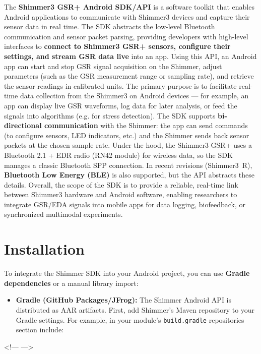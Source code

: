The \textbf{Shimmer3 GSR+ Android SDK/API} is a software toolkit that enables
Android applications to communicate with Shimmer3 devices and capture
their sensor data in real time. The SDK abstracts the low-level
Bluetooth communication and sensor packet parsing, providing developers
with high-level interfaces to \textbf{connect to Shimmer3 GSR+ sensors,
configure their settings, and stream GSR data live} into an
app\cite{GSRFacialThermal2021}.
Using this API, an Android app can start and stop GSR signal acquisition
on the Shimmer, adjust parameters (such as the GSR measurement range or
sampling rate), and retrieve the sensor readings in calibrated units.
The primary purpose is to facilitate real-time data collection from the
Shimmer3 on Android devices --- for example, an app can display live GSR
waveforms, log data for later analysis, or feed the signals into
algorithms (e.g. for stress detection). The SDK supports
\textbf{bi-directional communication} with the Shimmer: the app can send
commands (to configure sensors, LED indicators, etc.) and the Shimmer
sends back sensor packets at the chosen sample rate. Under the hood, the
Shimmer3 GSR+ uses a Bluetooth 2.1 + EDR radio (RN42
module)\cite{StressDefinitionHH}
for wireless data, so the SDK manages a classic Bluetooth SPP
connection. In recent revisions (Shimmer3 R), \textbf{Bluetooth Low Energy
(BLE)} is also
supported\cite{CortisolStressIndicator2020}, 
but the API abstracts these details. Overall, the scope of the SDK is to
provide a reliable, real-time link between Shimmer3 hardware and
Android software, enabling researchers to integrate GSR/EDA signals into
mobile apps for data logging, biofeedback, or synchronized multimodal
experiments.

\section{Installation}

To integrate the Shimmer SDK into your Android project, you can use
\textbf{Gradle dependencies} or a manual library import:

\begin{itemize}
\item \textbf{Gradle (GitHub Packages/JFrog):} The Shimmer Android API is
  distributed as AAR artifacts. First, add Shimmer's Maven repository to
  your Gradle settings. For example, in your module's \texttt{build.gradle}
  repositories section include:

\end{itemize}
<!--- --->

